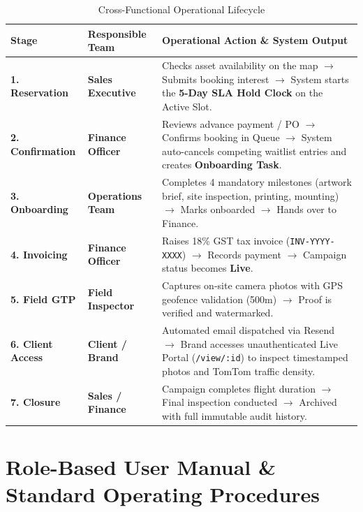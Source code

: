 \documentclass[11pt,a4paper]{article}
\begin{document}
\begin{table}[h!]
\centering
\small
\renewcommand{\arraystretch}{1.35}
\begin{tabularx}{\textwidth}{p{2.8cm} p{3.2cm} X}
\toprule
\textbf{Stage} & \textbf{Responsible Team} & \textbf{Operational Action \& System Output} \\
\midrule
\textbf{1. Reservation} & \textbf{Sales Executive} & Checks asset availability on the map $\rightarrow$ Submits booking interest $\rightarrow$ System starts the \textbf{5-Day SLA Hold Clock} on the Active Slot. \\
\textbf{2. Confirmation} & \textbf{Finance Officer} & Reviews advance payment / PO $\rightarrow$ Confirms booking in Queue $\rightarrow$ System auto-cancels competing waitlist entries and creates \textbf{Onboarding Task}. \\
\textbf{3. Onboarding} & \textbf{Operations Team} & Completes 4 mandatory milestones (artwork brief, site inspection, printing, mounting) $\rightarrow$ Marks onboarded $\rightarrow$ Hands over to Finance. \\
\textbf{4. Invoicing} & \textbf{Finance Officer} & Raises 18\% GST tax invoice (\texttt{INV-YYYY-XXXX}) $\rightarrow$ Records payment $\rightarrow$ Campaign status becomes \textbf{Live}. \\
\textbf{5. Field GTP} & \textbf{Field Inspector} & Captures on-site camera photos with GPS geofence validation (500m) $\rightarrow$ Proof is verified and watermarked. \\
\textbf{6. Client Access} & \textbf{Client / Brand} & Automated email dispatched via Resend $\rightarrow$ Brand accesses unauthenticated Live Portal (\texttt{/view/:id}) to inspect timestamped photos and TomTom traffic density. \\
\textbf{7. Closure} & \textbf{Sales / Finance} & Campaign completes flight duration $\rightarrow$ Final inspection conducted $\rightarrow$ Archived with full immutable audit history. \\
\bottomrule
\end{tabularx}
\caption{Cross-Functional Operational Lifecycle}
\end{table}

\newpage

\section{Role-Based User Manual \& Standard Operating Procedures}
\end{document}

